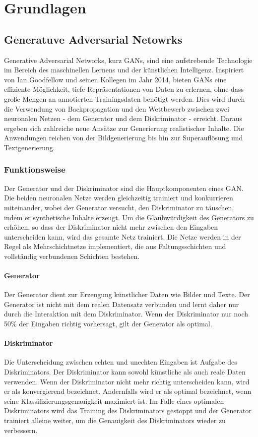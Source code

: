 \chapter{Grundlagen}

\section{Generatuve Adversarial Netowrks}
Generative Adversarial Networks, kurz GANs, sind eine aufstrebende Technologie im Bereich des maschinellen Lernens und der künstlichen Intelligenz. Inspiriert von Ian Goodfellow und seinen Kollegen im Jahr 2014, bieten GANs eine effiziente Möglichkeit, tiefe Repräsentationen von Daten zu erlernen, ohne dass große Mengen an annotierten Trainingsdaten benötigt werden. 
Dies wird durch die Verwendung von Backpropagation und den Wettbewerb zwischen zwei neuronalen Netzen - dem Generator und dem Diskriminator - erreicht. 
Daraus ergeben sich zahlreiche neue Ansätze zur Generierung realistischer Inhalte. 
Die Anwendungen reichen von der Bildgenerierung bis hin zur Superauflösung und Textgenerierung.

\subsection*{Funktionsweise}
Der Generator und der Diskriminator sind die Hauptkomponenten eines GAN. Die beiden neuronalen Netze werden gleichzeitig trainiert und konkurrieren miteinander, wobei der Generator versucht, den Diskriminator zu täuschen, indem er synthetische Inhalte erzeugt. Um die Glaubwürdigkeit des Generators zu erhöhen, so dass der Diskriminator nicht mehr zwischen den Eingaben unterscheiden kann, wird das gesamte Netz trainiert. Die Netze werden in der Regel als Mehrschichtnetze implementiert, die aus Faltungsschichten und vollständig verbundenen Schichten bestehen.

\subsubsection*{Generator}
Der Generator dient zur Erzeugung künstlicher Daten wie Bilder und Texte. 
Der Generator ist nicht mit dem realen Datensatz verbunden und lernt daher nur durch die Interaktion mit dem Diskriminator. Wenn der Diskriminator nur noch 50\% der Eingaben richtig vorhersagt, gilt der Generator als optimal.

\subsubsection*{Diskriminator}
Die Unterscheidung zwischen echten und unechten Eingaben ist Aufgabe des Diskriminators. Der Diskriminator kann sowohl künstliche als auch reale Daten verwenden. 
Wenn der Diskriminator nicht mehr richtig unterscheiden kann, wird er als konvergierend bezeichnet. Andernfalls wird er als optimal bezeichnet, wenn seine Klassifizierungsgenauigkeit maximiert ist. Im Falle eines optimalen Diskriminators wird das Training des Diskriminators gestoppt und der Generator trainiert alleine weiter, um die Genauigkeit des Diskriminators wieder zu verbessern.

